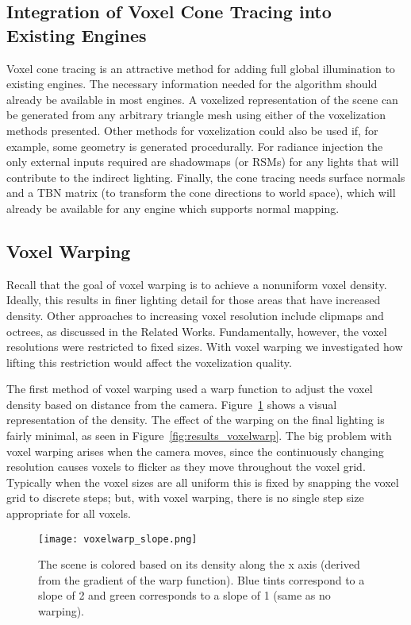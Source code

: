 \subsection{Integration of Voxel Cone Tracing into Existing Engines}
Voxel cone tracing is an attractive method for adding full global illumination to existing engines. The necessary information needed for the algorithm should already be available in most engines. A voxelized representation of the scene can be generated from any arbitrary triangle mesh using either of the voxelization methods presented. Other methods for voxelization could also be used if, for example, some geometry is generated procedurally. For radiance injection the only external inputs required are shadowmaps (or RSMs) for any lights that will contribute to the indirect lighting. Finally, the cone tracing needs surface normals and a TBN matrix (to transform the cone directions to world space), which will already be available for any engine which supports normal mapping.

\subsection{Voxel Warping}
Recall that the goal of voxel warping is to achieve a nonuniform voxel density. Ideally, this results in finer lighting detail for those areas that have increased density. Other approaches to increasing voxel resolution include clipmaps and octrees, as discussed in the Related Works. Fundamentally, however, the voxel resolutions were restricted to fixed sizes. With voxel warping we investigated how lifting this restriction would affect the voxelization quality.

The first method of voxel warping used a warp function to adjust the voxel density based on distance from the camera. Figure~\ref{fig:results_warpslope} shows a visual representation of the density. The effect of the warping on the final lighting is fairly minimal, as seen in Figure~\ref{fig:results_voxelwarp}. The big problem with voxel warping arises when the camera moves, since the continuously changing resolution causes voxels to flicker as they move throughout the voxel grid. Typically when the voxel sizes are all uniform this is fixed by snapping the voxel grid to discrete steps; but, with voxel warping, there is no single step size appropriate for all voxels.

\begin{figure}[h!]
    \centering
    \texttt{[image: voxelwarp\_slope.png]}
    \caption{The scene is colored based on its density along the x axis (derived from the gradient of the warp function). Blue tints correspond to a slope of 2 and green corresponds to a slope of 1 (same as no warping).}
    \label{fig:results_warpslope}
\end{figure}

